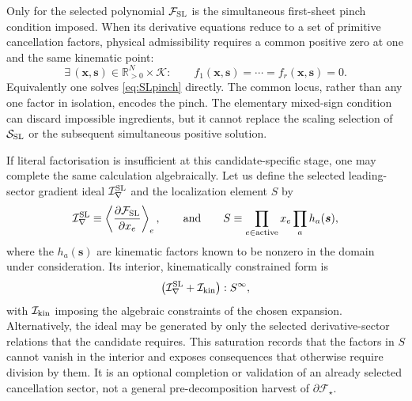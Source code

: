 \documentclass[a4paper,11pt]{article}
\newcommand{\x}{\boldsymbol{x}}
\newcommand{\s}{\boldsymbol{s}}
\newcommand{\K}{\mathcal K}
\newcommand{\FSL}{\mathcal F_{\rm SL}}
\newcommand{\SSL}{\mathcal S_{\rm SL}}
\newcommand{\Rpos}{\mathbb R_{>0}}
\begin{document}
Only for the selected polynomial \(\FSL\) is the simultaneous first-sheet
pinch condition imposed.  When its derivative equations reduce to a set of
primitive cancellation factors, physical admissibility requires a common
positive zero at one and the same kinematic point:
\begin{equation}
 \exists\,(\x,\s)\in\Rpos^N\times\K:
 \qquad f_1(\x,\s)=\cdots=f_r(\x,\s)=0.
\label{eq:commonzero}
\end{equation}
Equivalently one solves \eqref{eq:SLpinch} directly.  The common locus,
rather than any one factor in isolation, encodes the pinch.  The elementary
mixed-sign condition can discard impossible ingredients, but it cannot
replace the scaling selection of \(\SSL\) or the subsequent simultaneous
positive solution.

If literal factorisation is insufficient at this candidate-specific stage,
one may complete the same calculation algebraically.  Let us define the
selected leading-sector gradient ideal \(\mathcal I_\nabla^{\rm SL}\) and
the localization element \(S\) by
\begin{equation}
 \mathcal I_\nabla^{\rm SL}\equiv
 \left\langle\frac{\partial\FSL}{\partial x_e}\right\rangle_e,
 \qquad\text{and}\qquad
 S\equiv\prod_{e\in\mathrm{active}}x_e\prod_a h_a(\s),
 \label{eq:selected-gradient-ideal}
\end{equation}
where the \(h_a(\s)\) are kinematic factors known to be nonzero in the
domain under consideration.  Its interior, kinematically constrained form
is
\begin{equation}
 \bigl(\mathcal I_\nabla^{\rm SL}+\mathcal I_{\rm kin}\bigr):S^\infty,
 \label{eq:selected-gradient-saturation}
\end{equation}
with \(\mathcal I_{\rm kin}\) imposing the algebraic constraints of the
chosen expansion.  Alternatively, the ideal may be generated by only the
selected derivative-sector relations that the candidate requires.  This
saturation records that the factors in \(S\) cannot vanish in the interior
and exposes consequences that otherwise require division by them.  It is an
optional completion or validation of an already selected cancellation
sector, not a general pre-decomposition harvest of
\(\partial\mathcal F_\star\).
\end{document}

